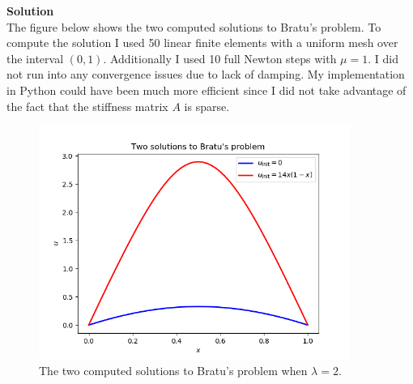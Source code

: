 \documentclass[11pt]{article}
\begin{document}
\begin{enumerate}
\begin{enumerate}
{\bf Solution}\\
The figure below shows the two computed solutions to Bratu's problem.  To compute the solution I used 50 linear finite elements with a uniform mesh over the interval $(0,1)$.  Additionally I used 10 full Newton steps with $\mu = 1$.  I did not run into any convergence issues due to lack of damping.  My implementation in Python could have been much more efficient since I did not take advantage of the fact that the stiffness matrix $A$ is sparse.

\begin{figure}[H]
\centering
\includegraphics[width = 4in]{bratu_sol.png}
\caption{The two computed solutions to Bratu's problem when $\lambda = 2$.}
\label{fig:bratu_sol}
\end{figure}
 
\end{enumerate}


\end{enumerate}
\end{document}
